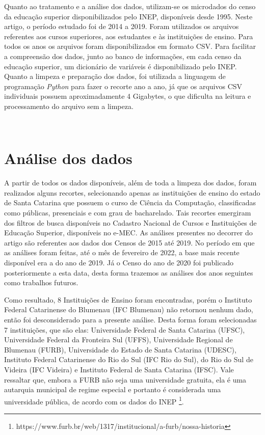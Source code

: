 \documentclass[a4paper]{article}
\begin{document}
Quanto ao tratamento e a análise dos dados, utilizam-se os microdados do censo da educação superior disponibilizados pelo INEP, disponíveis desde 1995. Neste artigo, o período estudado foi de 2014 a 2019. Foram utilizados os arquivos referentes aos cursos superiores, aos estudantes e às instituições de ensino. Para todos os anos os arquivos foram disponibilizados em formato CSV. Para facilitar a compreensão dos dados, junto ao banco de informações, em cada censo da educação superior, um dicionário de variáveis é disponibilizado pelo INEP. Quanto a limpeza e preparação dos dados, foi utilizada a linguagem de programação \textit{Python} para fazer o recorte ano a ano, já que os arquivos CSV individuais possuem aproximadamente 4 Gigabytes, o que dificulta na leitura e processamento do arquivo sem a limpeza.
 
\\
\section{Análise dos dados}\label{analisedosdados}
A partir de todos os dados disponíveis, além de toda a limpeza dos dados, foram realizados alguns recortes, selecionando apenas as instituições de ensino do estado de Santa Catarina que possuem o curso de Ciência da Computação, classificadas como públicas, presenciais e com grau de bacharelado. Tais recortes emergiram dos filtros de busca disponíveis no Cadastro Nacional de Cursos e Instituições de Educação Superior, disponíveis no e-MEC. As análises presentes no decorrer do artigo são referentes aos dados dos Censos de 2015 até 2019. No período em que as análises foram feitas, até o mês de fevereiro de 2022, a base mais recente disponível era a do ano de 2019. Já o Censo do ano de 2020 foi publicado posteriormente a esta data, desta forma trazemos as análises dos anos seguintes como trabalhos futuros.

Como resultado, 8 Instituições de Ensino foram encontradas, porém o Instituto Federal Catarinense do Blumenau (IFC Blumenau) não retornou nenhum dado, então foi desconsiderado para a presente análise. Desta forma foram selecionadas 7 instituições, que são elas: Universidade Federal de Santa Catarina (UFSC), Universidade Federal da Fronteira Sul (UFFS), Universidade Regional de Blumenau (FURB), Universidade do Estado de Santa Catarina (UDESC), Instituto Federal Catarinense  do Rio do Sul (IFC Rio do Sul),  do Rio do Sul de Videira (IFC Videira) e Instituto Federal de Santa Catarina (IFSC). Vale ressaltar que, embora a FURB não seja uma universidade gratuita, ela é uma autarquia municipal de regime especial e portanto é considerada uma universidade pública, de acordo com os dados do INEP \footnote{https://www.furb.br/web/1317/institucional/a-furb/nossa-historia}.
\end{document}
